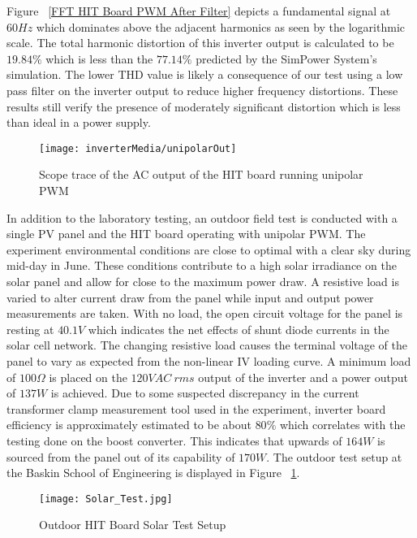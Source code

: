 Figure ~\ref{FFT HIT Board PWM After Filter} depicts a fundamental signal at $60 Hz$ which dominates above the adjacent harmonics as seen by the logarithmic scale. The total harmonic distortion of this inverter output is calculated to be $19.84\%$ which is less than the $77.14\%$ predicted by the SimPower System's simulation. The lower THD value is likely a consequence of our test using a low pass filter on the inverter output to reduce higher frequency distortions.  These results still verify the presence of moderately significant distortion which is less than ideal in a power supply. 

\begin{figure}[hb]
\centering
\texttt{[image: inverterMedia/unipolarOut]}
\caption{Scope trace of the AC output of the HIT board running unipolar PWM}
\end{figure}

In addition to the laboratory testing, an outdoor field test is conducted with a single PV panel and the HIT board operating with unipolar PWM. The experiment environmental conditions are close to optimal with a clear sky during mid-day in June. These conditions contribute to a high solar irradiance on the solar panel and allow for close to the maximum power draw. A resistive load is varied to alter current draw from the panel while input and output power measurements are taken. With no load, the open circuit voltage for the panel is resting at $40.1V$ which indicates the net effects of shunt diode currents in the solar cell network. The changing resistive load causes the terminal voltage of the panel to vary as expected from the non-linear IV loading curve. A minimum load of $100\Omega$ is placed on the $120VAC~ rms$ output of the inverter and a power output of $137W$ is achieved. Due to some suspected discrepancy in the current transformer clamp measurement tool used in the experiment, inverter board efficiency is approximately estimated to be about $80\%$ which correlates with the testing done on the boost converter. This indicates that upwards of $164W$ is sourced from the panel out of its capability of $170W$. The outdoor test setup at the Baskin School of Engineering is displayed in Figure ~\ref{Solar Test Setup}.

\begin{figure}
\centering
\texttt{[image: Solar\_Test.jpg]}
\caption{Outdoor HIT Board Solar Test Setup}
\label{Solar Test Setup}
\end{figure}
  

